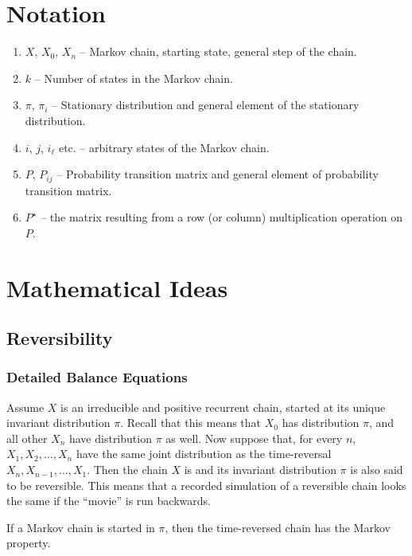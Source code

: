 \documentclass[12pt]{article}
\begin{document}
\section*{Notation}
\begin{enumerate}
\item $X$, $X_0$, $X_n$ -- Markov chain, starting state, general step
  of the chain.
\item $k$ -- Number of states in the Markov chain.
\item $\pi$, $\pi_i$ -- Stationary distribution and general element of
  the stationary distribution.
\item $i$, $j$, $i_{\ell}$ etc. -- arbitrary states of the Markov
  chain.
\item $P$, $P_{ij}$ -- Probability transition matrix and general
  element of probability transition matrix.
\item $P^{\star}$ -- the matrix resulting from a row (or column) multiplication operation on $P$.
\end{enumerate}
\hr

\section*{Mathematical Ideas}
\subsection*{Reversibility}

\subsubsection*{Detailed Balance Equations}

Assume $X$ is an irreducible and positive recurrent chain, started at its unique invariant
distribution $\pi$. Recall that this means that $X_0$ has distribution
$\pi$, and all other $X_n$ have distribution $\pi$ as well.
Now suppose that, for every $n$, $X_1, X_2, \dots , X_n$ have the same joint distribution as the time-reversal
$X_n, X_{n−1}, \dots , X_1$. Then the chain $X$ is 
and its invariant distribution $\pi$ is also said to be reversible. This means that a recorded simulation of a reversible
chain looks the same if the ``movie'' is run backwards.

\begin{proposition}
  If a Markov chain is started in $\pi$, then the time-reversed chain
  has the Markov property.
\end{proposition}
\end{document}
